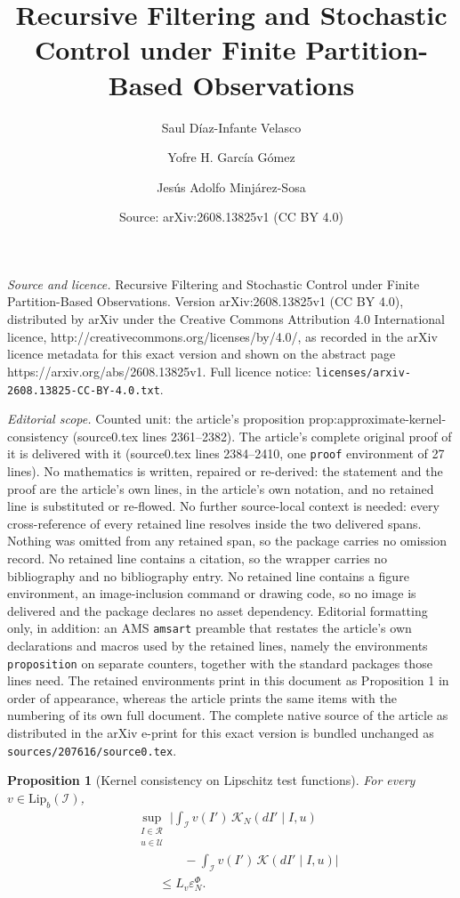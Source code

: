 \documentclass[10pt,a4paper]{amsart}
\title{Recursive Filtering and Stochastic Control under Finite Partition-Based Observations}
\author{Saul Díaz-Infante Velasco \and Yofre H. García Gómez \and Jesús Adolfo Minjárez-Sosa}
\date{Source: arXiv:2608.13825v1 (CC BY 4.0)}
\newtheorem{proposition}{Proposition}
\newcommand{\Ical}{\mathcal{I}}
\newcommand{\Ucal}{\mathcal{U}}
\begin{document}
\maketitle

\noindent\emph{Source and licence.} Recursive Filtering and Stochastic Control under Finite Partition-Based Observations. Version arXiv:2608.13825v1 (CC BY 4.0), distributed by arXiv under the Creative Commons Attribution 4.0 International licence, http://creativecommons.org/licenses/by/4.0/, as recorded in the arXiv licence metadata for this exact version and shown on the abstract page https://arxiv.org/abs/2608.13825v1. Full licence notice: \texttt{licenses/arxiv-2608.13825-CC-BY-4.0.txt}.\par\smallskip

\noindent\textit{Editorial scope.} Counted unit: the article's proposition prop:approximate-kernel-consistency (source0.tex lines 2361--2382). The article's complete original proof of it is delivered with it (source0.tex lines 2384--2410, one \texttt{proof} environment of 27 lines). No mathematics is written, repaired or re-derived: the statement and the proof are the article's own lines, in the article's own notation, and no retained line is substituted or re-flowed.  No further source-local context is needed: every cross-reference of every retained line resolves inside the two delivered spans.  Nothing was omitted from any retained span, so the package carries no omission record.  No retained line contains a citation, so the wrapper carries no bibliography and no bibliography entry.  No retained line contains a figure environment, an image-inclusion command or drawing code, so no image is delivered and the package declares no asset dependency.  Editorial formatting only, in addition: an AMS \texttt{amsart} preamble that restates the article's own declarations and macros used by the retained lines, namely the environments \texttt{proposition} on separate counters, together with the standard packages those lines need.  The retained environments print in this document as Proposition 1 in order of appearance, whereas the article prints the same items with the numbering of its own full document.  The complete native source of the article as distributed in the arXiv e-print for this exact version is bundled unchanged as \texttt{sources/207616/source0.tex}.
\begin{proposition}[Kernel consistency on Lipschitz test functions]
	\label{prop:approximate-kernel-consistency}
	For every \(v\in\mathrm{Lip}_b(\Ical)\),
	\begin{equation*}
		\begin{aligned}
			&\sup_{\substack{I\in\mathcal R\\ u\in\Ucal}}
			\Bigg|
			\int_{\mathcal I}
			v(I')\,\mathcal K_N(dI'\mid I,u)
			\\
			&\qquad\qquad
			-
			\int_{\mathcal I}
			v(I')\,\mathcal K(dI'\mid I,u)
			\Bigg|
			\\
			&\qquad\leq
			L_v\varepsilon_N^{\Phi}.
		\end{aligned}
		\label{eq:kernel-consistency-bound}
	\end{equation*}
\end{proposition}
\end{document}
